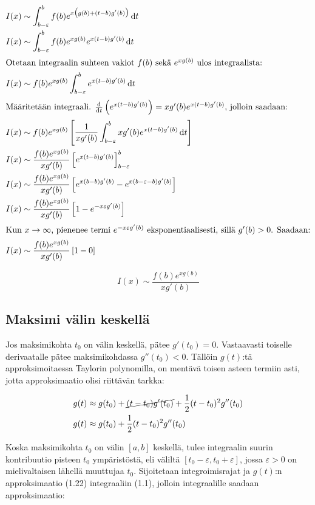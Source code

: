 \documentclass[]{article}
\numberwithin{equation}{section}
\begin{document}
\begin{align}
	I(x) &\sim \int_{b - \varepsilon}^{b}f(b)e^{x\big(g(b) + (t - b)g'(b)\big)}\odif{t} \\
	I(x) &\sim \int_{b - \varepsilon}^{b}f(b)e^{xg(b)}e^{x(t - b)g'(b)}\odif{t} \\
	\intertext{Otetaan integraalin suhteen vakiot $f(b)$ sekä $e^{xg(b)}$ ulos integraalista:}
	I(x) &\sim f(b)e^{xg(b)}\int_{b - \varepsilon}^{b}e^{x(t - b)g'(b)}\odif{t} \\
	\intertext{Määritetään integraali. $\odv{}{t}\left(e^{x(t - b)g'(b)}\right) = xg'(b)e^{x(t - b)g'(b)}$, jolloin saadaan:}
	I(x) &\sim f(b)e^{xg(b)}\left[\frac{1}{xg'(b)}\int_{b - \varepsilon}^{b}xg'(b)e^{x(t - b)g'(b)}\odif{t}\right] \\
	I(x) &\sim \frac{f(b)e^{xg(b)}}{xg'(b)}\left[e^{x(t - b)g'(b)}\right]_{b - \varepsilon}^{b} \\
	I(x) &\sim \frac{f(b)e^{xg(b)}}{xg'(b)}\left[e^{x(b - b)g'(b)} - e^{x(b - \varepsilon - b)g'(b)}\right] \\
	I(x) &\sim \frac{f(b)e^{xg(b)}}{xg'(b)}\left[1 - e^{-x\varepsilon g'(b)}\right] \\
	\intertext{Kun $x \to \infty$, pienenee termi $e^{-x\varepsilon g'(b)}$ eksponentiaalisesti, sillä $g'(b) > 0$. Saadaan:}
	I(x) &\sim \frac{f(b)e^{xg(b)}}{xg'(b)}\left[1 - 0\right]
\end{align}

\begin{equation}
	\boxed{I(x) \sim \frac{f(b)e^{xg(b)}}{xg'(b)}}
\end{equation}

\subsection{Maksimi välin keskellä}

Jos maksimikohta $t_0$ on välin keskellä, pätee $g'(t_0) = 0$. Vastaavasti toiselle derivaatalle pätee maksimikohdassa $g''(t_0) < 0$. Tällöin $g(t)$:tä approksimoitaessa Taylorin polynomilla, on mentävä toisen asteen termiin asti, jotta approksimaatio olisi riittävän tarkka:

\begin{align}
	g(t) &\approx g(t_0) + \cancel{(t - t_0)g'(t_0)} + \frac{1}{2}(t - t_0)^2g''(t_0) \\
	g(t) &\approx g(t_0) + \frac{1}{2}(t - t_0)^2g''(t_0)
\end{align}

Koska maksimikohta $t_0$ on välin $[a, b]$ keskellä, tulee integraalin suurin kontribuutio pisteen $t_0$ ympäristöstä, eli väliltä $[t_0 - \varepsilon, t_0 + \varepsilon]$, jossa $\varepsilon > 0$ on mielivaltaisen lähellä muuttujaa $t_0$. Sijoitetaan integroimisrajat ja $g(t)$:n approksimaatio (1.22) integraaliin (1.1), jolloin integraalille saadaan approksimaatio:
\end{document}
